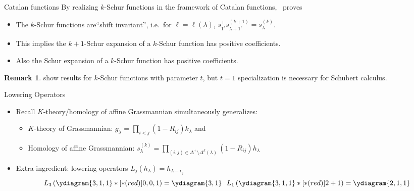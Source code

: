 \documentclass{beamer}
\theoremstyle{definition}
\newtheorem{rmk}[thm]{Remark}
\begin{document}
\begin{frame}{Catalan functions}
  By realizing \(k\)-Schur functions in the framework of Catalan
  functions,~\cite{catalans} proves\pause
  \begin{itemize}
  \item The \(k\)-Schur functions are``shift invariant'', i.e.\ for
    \(\ell = \ell(\lambda)\), \(s_{1^\ell}^\perp
    s_{\lambda+1^\ell}^{(k+1)} = s_\lambda^{(k)}\).\pause
  \item This implies the \(k{+}1\)-Schur expansion of a \(k\)-Schur function has
    positive coefficients. \pause
  \item Also the Schur expansion of a \(k\)-Schur function has positive coefficients.\pause
  \end{itemize}
  \begin{rmk}
   \cite{catalans} show results for \(k\)-Schur functions with
   parameter \(t\), but \(t=1\) specialization is necessary for
   Schubert calculus.
  \end{rmk}
\end{frame}
\begin{frame}{Lowering Operators}
  \begin{itemize}
  \item Recall \(K\)-theory/homology of affine Grassmannian
    simultaneously generalizes:
    \begin{itemize}
    \item \(K\)-theory of Grassmannian: \(g_\lambda = \prod_{i < j}
      (1-R_{ij}) k_\lambda\) and \pause
    \item Homology of affine Grassmannian: \(s_\lambda^{(k)} =
      \prod_{(i,j)\in \Delta^+ \setminus \Delta^{k}(\lambda)}
      (1-R_{ij}) h_\lambda\) \pause
    \end{itemize}
  \item Extra ingredient: lowering operators
     \(L_j(h_\lambda) = h_{\lambda-\epsilon_j}\)
            \[ L_3\left( \ydiagram{3,1,1}*[*(red)]{0,0,1} \right) =
              \ydiagram{3,1} \ \ L_{1}\left( \ydiagram{3,1,1}*[*(red)]{2+1} \right)
              = \ydiagram{2,1,1}
              \]
  \end{itemize}
\end{frame}
\end{document}
